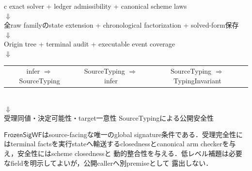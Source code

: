\begin{center}
\begin{tabular}{c}
exact solver + ledger admissibility + canonical scheme laws \\
$\Downarrow$ \\
全raw familyのstate extension + chronological factorization + solved-form保存 \\
$\Downarrow$ \\
Origin tree + terminal audit + executable event coverage \\
$\Downarrow$ \\
\begin{tabular}{c@{\qquad}c@{\qquad}c}
infer $\Rightarrow$ SourceTyping & SourceTyping $\Rightarrow$ infer & SourceTyping $\Rightarrow$ TypingInvariant
\end{tabular} \\
$\Downarrow$ \\
受理同値・決定可能性・target一意性
\qquad
SourceTypingによる公開安全性
\end{tabular}
\end{center}

$\mathsf{FrozenSigWF}$はsource-facingな唯一のglobal signature条件である．受理完全性にはterminal
factsを実行stateへ輸送するclosednessとcanonical arm checkerを与え，安全性にはscheme closednessと
動的整合性を与える．低レベル補題は必要なfieldを明示してよいが，公開callerへ別premiseとして
露出しない．
